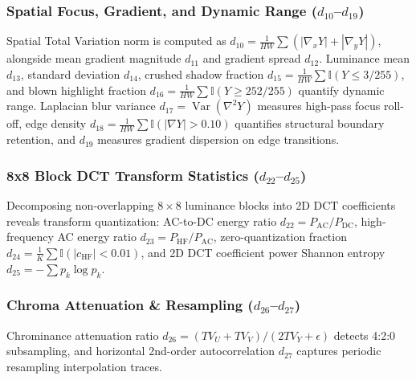 \documentclass[conference]{IEEEtran}
\begin{document}
\subsubsection{Spatial Focus, Gradient, and Dynamic Range ($d_{10}$--$d_{19}$)}
Spatial Total Variation norm is computed as $d_{10} = \frac{1}{HW}\sum (|\nabla_x Y| + |\nabla_y Y|)$, alongside mean gradient magnitude $d_{11}$ and gradient spread $d_{12}$. Luminance mean $d_{13}$, standard deviation $d_{14}$, crushed shadow fraction $d_{15} = \frac{1}{HW}\sum \mathbb{I}(Y \le 3/255)$, and blown highlight fraction $d_{16} = \frac{1}{HW}\sum \mathbb{I}(Y \ge 252/255)$ quantify dynamic range. Laplacian blur variance $d_{17} = \operatorname{Var}(\nabla^2 Y)$ measures high-pass focus roll-off, edge density $d_{18} = \frac{1}{HW}\sum \mathbb{I}(|\nabla Y| > 0.10)$ quantifies structural boundary retention, and $d_{19}$ measures gradient dispersion on edge transitions.

\subsubsection{8x8 Block DCT Transform Statistics ($d_{22}$--$d_{25}$)}
Decomposing non-overlapping $8\times8$ luminance blocks into 2D DCT coefficients reveals transform quantization: AC-to-DC energy ratio $d_{22} = P_{\text{AC}}/P_{\text{DC}}$, high-frequency AC energy ratio $d_{23} = P_{\text{HF}}/P_{\text{AC}}$, zero-quantization fraction $d_{24} = \frac{1}{K}\sum \mathbb{I}(|c_{\text{HF}}| < 0.01)$, and 2D DCT coefficient power Shannon entropy $d_{25} = -\sum p_k \log p_k$.

\subsubsection{Chroma Attenuation \& Resampling ($d_{26}$--$d_{27}$)}
Chrominance attenuation ratio $d_{26} = (TV_U + TV_V)/(2 TV_Y + \epsilon)$ detects 4:2:0 subsampling, and horizontal 2nd-order autocorrelation $d_{27}$ captures periodic resampling interpolation traces.
\end{document}
